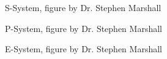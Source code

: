 \documentclass{style/CRPITStyle}
\begin{document}
\begin{figure}[htb]
\caption{\protect\label{s-system}  S-System, figure by Dr. Stephen Marshall  }
\end{figure}

\vspace{.1in}

\vspace{.1in}

\begin{figure}[htb]
\caption{\protect\label{p-system}  P-System, figure by Dr. Stephen Marshall  }
\end{figure}

\vspace{.1in}

\vspace{.1in}

\begin{figure}[htb]
\caption{\protect\label{e-system}  E-System, figure by Dr. Stephen Marshall  }
\end{figure}
\end{document}
